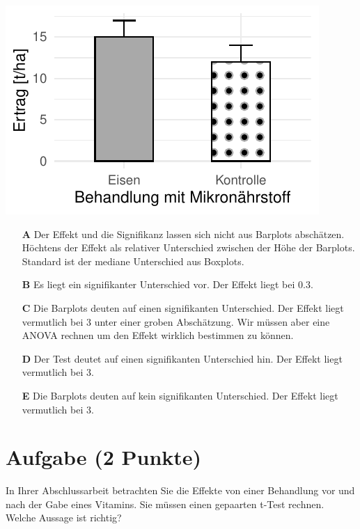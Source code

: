 \documentclass[a4paper, 9pt]{scrartcl}\usepackage[]{graphicx}\usepackage[]{xcolor}
\makeatletter
\def\maxwidth{ %
  \ifdim\Gin@nat@width>\linewidth
    \linewidth
  \else
    \Gin@nat@width
  \fi
}
\makeatother
\begin{document}
{\centering \includegraphics[width=\maxwidth]{img/mc-testing-ttest-02-1} 

}







\begin{enumerate}
\item [\textbf{A} \msquare] Der Effekt und die Signifikanz lassen sich nicht aus Barplots abschätzen. Höchtens der Effekt als relativer Unterschied zwischen der Höhe der Barplots. Standard ist der mediane Unterschied aus Boxplots.
\item [\textbf{B} \msquare] Es liegt ein signifikanter Unterschied vor. Der Effekt liegt bei 0.3.
\item [\textbf{C} \msquare] Die Barplots deuten auf einen signifikanten Unterschied. Der Effekt liegt vermutlich bei 3 unter einer groben Abschätzung. Wir müssen aber eine ANOVA rechnen um den Effekt wirklich bestimmen zu können.
\item [\textbf{D} \msquare] Der Test deutet auf einen signifikanten Unterschied hin. Der Effekt liegt vermutlich bei 3.
\item [\textbf{E} \msquare] Die Barplots deuten auf kein signifikanten Unterschied. Der Effekt liegt vermutlich bei 3.
\end{enumerate}

\section{Aufgabe \hfill (2 Punkte)}




In Ihrer Abschlussarbeit betrachten Sie die Effekte von einer Behandlung vor und nach der Gabe eines Vitamins. Sie müssen einen gepaarten t-Test rechnen. Welche Aussage ist richtig?
\end{document}
